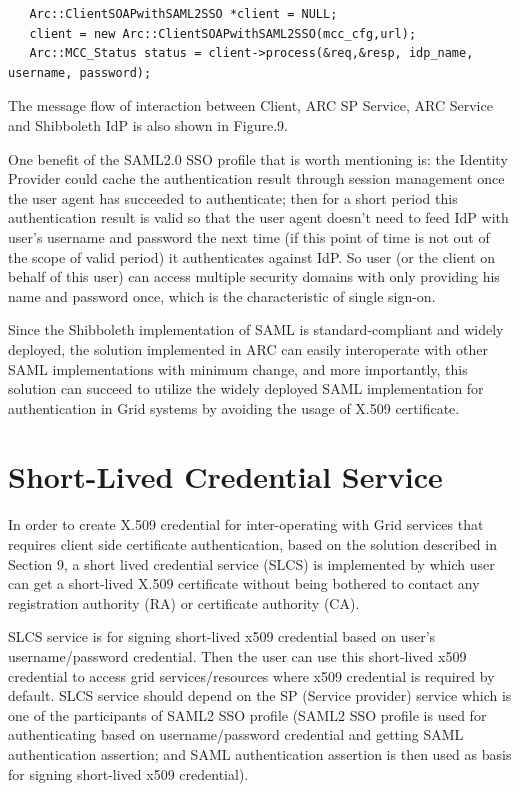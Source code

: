 \documentclass{article}                            %
\begin{document}
\begin{verbatim}
   Arc::ClientSOAPwithSAML2SSO *client = NULL;
   client = new Arc::ClientSOAPwithSAML2SSO(mcc_cfg,url);
   Arc::MCC_Status status = client->process(&req,&resp, idp_name, username, password);
\end{verbatim}

    The message flow of interaction between Client, ARC SP Service, ARC Service and Shibboleth IdP is also shown in Figure.9.

  One benefit of the SAML2.0 SSO profile that is worth mentioning is: the Identity Provider could cache the authentication result through session management once the user agent has succeeded to authenticate; then for a short period this authentication result is valid so that the user agent doesn’t need to feed IdP with user’s username and password the next time (if this point of time is not out of the scope of valid period) it authenticates against IdP. So user (or the client on behalf of this user) can access multiple security  domains with only providing his name and password once, which is the characteristic of single sign-on.

    Since the Shibboleth implementation of SAML is standard-compliant and widely deployed, the solution implemented in ARC can easily interoperate with other SAML implementations with minimum change, and more importantly, this solution can succeed to utilize the widely deployed SAML implementation for authentication in Grid systems by avoiding the usage of X.509 certificate.




\section{Short-Lived Credential Service} %
\label{sec:slcs}
In order to create X.509 credential for inter-operating with Grid services that requires client side certificate authentication, based on the solution described in Section 9, a short lived credential service (SLCS) is implemented by which user can get a short-lived X.509 certificate without being bothered to contact any registration authority (RA) or certificate authority (CA).

    SLCS service is for signing short-lived x509 credential based on user's username/password credential. Then the user can use this short-lived x509 credential to access grid services/resources where x509 credential is required by default. SLCS service should depend on the SP (Service provider) service which is one of the participants of SAML2 SSO profile (SAML2 SSO profile is used for authenticating based on username/password credential and getting SAML authentication assertion; and SAML authentication assertion is then used as basis for signing short-lived x509 credential).
\end{document}
